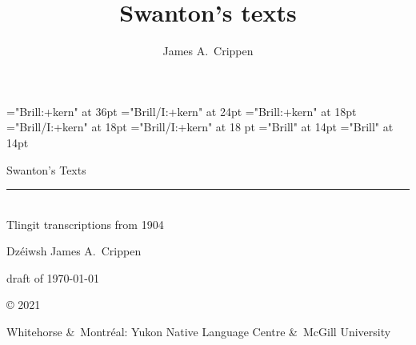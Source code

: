 
\thispagestyle{empty}

\title{Swanton’s texts}
\author{James A.\ Crippen}


\font\titlefont="Brill:+kern" at 36pt
\font\subtitlefont="Brill/I:+kern" at 24pt
\font\authorfont="Brill:+kern" at 18pt
\font\authoritalfont="Brill/I:+kern" at 18pt
\font\authorandfont="Brill/I:+kern" at 18 pt
\font\datefont="Brill" at 14pt
\font\copyfont="Brill" at 14pt

\pagestyle{empty}

\vspace*{1em}
\begin{center}
\titlefont
Swanton’s Texts \\[0.125em]
\rule{0.75\textwidth}{0.4pt} \\[0.25em]
\subtitlefont
Tlingit transcriptions from 1904
\end{center}
\normalfont

\begin{center}
\vspace*{3em}
\authoritalfont Dzéiwsh
\authorfont James A.\ Crippen
\end{center}
\normalfont

\begin{center}
\vspace*{18em}
\datefont
draft of \today
\end{center}
\normalfont

\vspace*{1em}
\begin{center}
\copyfont
© 2021 \theauthor
\end{center}

\vspace*{1em}
\begin{center}
Whitehorse \&\ Montréal: Yukon Native Language Centre \&\ McGill University
\end{center}